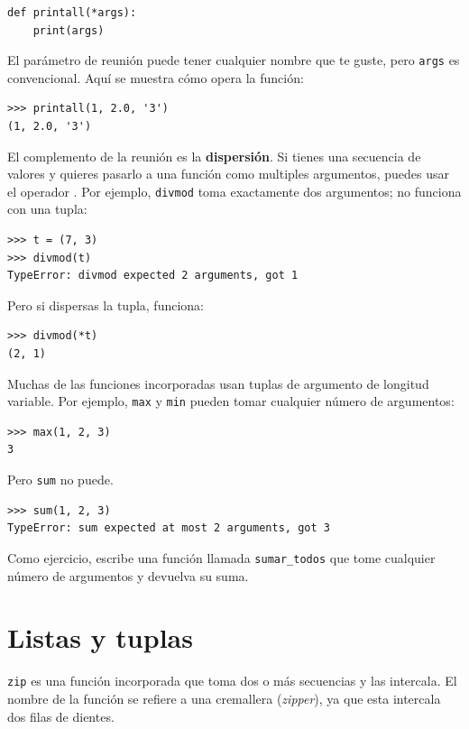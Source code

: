 \documentclass[10pt]{book}
\begin{document}
\begin{verbatim}
def printall(*args):
    print(args)
\end{verbatim}
%
El parámetro de reunión puede tener cualquier nombre que te guste, pero {\tt args} es
convencional.  Aquí se muestra cómo opera la función:

\begin{verbatim}
>>> printall(1, 2.0, '3')
(1, 2.0, '3')
\end{verbatim}
%
El complemento de la reunión es la {\bf dispersión}.  Si tienes una
secuencia de valores y quieres pasarlo a una función
como multiples argumentos, puedes usar el operador {\tt *}.
Por ejemplo, {\tt divmod} toma exactamente dos argumentos;
no funciona con una tupla:

\begin{verbatim}
>>> t = (7, 3)
>>> divmod(t)
TypeError: divmod expected 2 arguments, got 1
\end{verbatim}
%
Pero si dispersas la tupla, funciona:

\begin{verbatim}
>>> divmod(*t)
(2, 1)
\end{verbatim}
%
Muchas de las funciones incorporadas usan
tuplas de argumento de longitud variable.  Por ejemplo, {\tt max}
y {\tt min} pueden tomar cualquier número de argumentos:

\begin{verbatim}
>>> max(1, 2, 3)
3
\end{verbatim}
%
Pero {\tt sum} no puede.

\begin{verbatim}
>>> sum(1, 2, 3)
TypeError: sum expected at most 2 arguments, got 3
\end{verbatim}
%
Como ejercicio, escribe una función llamada \verb"sumar_todos" que tome cualquier número
de argumentos y devuelva su suma.


\section{Listas y tuplas}

{\tt zip} es una función incorporada que toma dos o más secuencias y
las intercala.  El nombre de la función se refiere a
una cremallera ({\em zipper}), ya que esta intercala dos filas de dientes.
\end{document}

